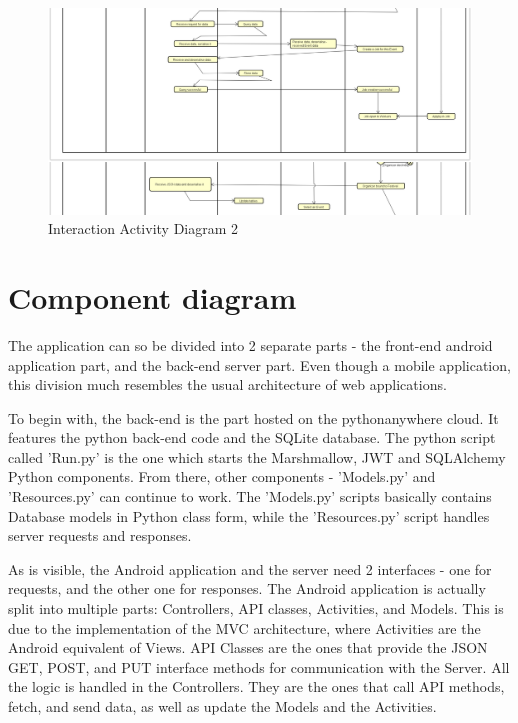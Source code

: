 		\begin{figure}[H]
			\includegraphics[width=\linewidth]{diagrams/Interaction_Activity_Diag_2.png}
			\caption{Interaction Activity Diagram 2}
			\label{fig:register_activity_diag_2}
		\end{figure}
			  
		\eject
			  
		\section{Component diagram}
			
			The application can so be divided into 2 separate parts - the front-end android application part, and the back-end server part. Even though a mobile application, this division much resembles the usual architecture of web applications.
			
			To begin with, the back-end is the part hosted on the pythonanywhere cloud. It features the python back-end code and the SQLite database. The python script called 'Run.py' is the one which starts the Marshmallow, JWT and SQLAlchemy Python components. From there, other components - 'Models.py' and 'Resources.py' can continue to work. The 'Models.py' scripts basically contains Database models in Python class form, while the 'Resources.py' script handles server requests and responses.
			
			As is visible, the Android application and the server need 2 interfaces - one for requests, and the other one for responses. The Android application is actually split into multiple parts: Controllers, API classes, Activities, and Models. This is due to the implementation of the MVC architecture, where Activities are the Android equivalent of Views. API Classes are the ones that provide the JSON GET, POST, and PUT interface methods for communication with the Server. All the logic is handled in the Controllers. They are the ones that call API methods, fetch, and send data, as well as update the Models and the Activities.
			
